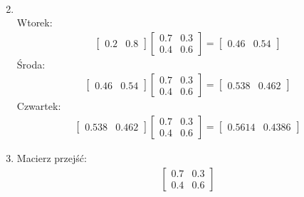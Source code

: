\documentclass[12pt]{article}
\begin{document}
\begin{enumerate}
\begin{align*}
        \end{align*}
        \item \hfill \\
        Wtorek:
        \begin{align*}
            \begin{bmatrix}
                0.2 & 0.8
            \end{bmatrix}
            \begin{bmatrix}
                0.7 & 0.3\\
                0.4 & 0.6
            \end{bmatrix}
            =
            \begin{bmatrix}
                0.46 & 0.54
            \end{bmatrix}
        \end{align*}
        Środa:
        \begin{align*}
            \begin{bmatrix}
                0.46 & 0.54
            \end{bmatrix}
            \begin{bmatrix}
                0.7 & 0.3\\
                0.4 & 0.6
            \end{bmatrix}
            =
            \begin{bmatrix}
                0.538 & 0.462
            \end{bmatrix}
        \end{align*}
        Czwartek:
        \begin{align*}
            \begin{bmatrix}
                0.538 & 0.462
            \end{bmatrix}
            \begin{bmatrix}
                0.7 & 0.3\\
                0.4 & 0.6
            \end{bmatrix}
            =
            \begin{bmatrix}
                0.5614 & 0.4386
            \end{bmatrix}
        \end{align*}
        \item Macierz przejść:
        \begin{align*}
            \begin{bmatrix}
                0.7 & 0.3\\
                0.4 & 0.6
            \end{bmatrix}

\end{align*}
\end{enumerate}
\end{document}
